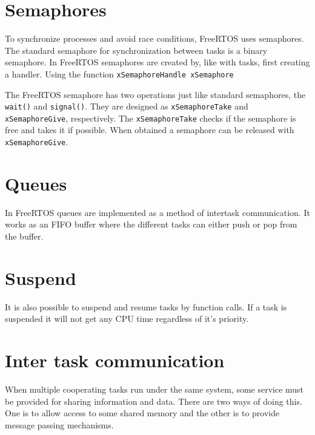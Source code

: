 \section{ Semaphores }

To synchronize processes and avoid race conditions, FreeRTOS uses semaphores. The standard semaphore for synchronization between tasks is a binary semaphore. In FreeRTOS semaphores are created by, like with tasks, first creating a handler. Using the function \texttt{xSemaphoreHandle xSemaphore}

The FreeRTOS semaphore has two operations just like standard semaphores, the \texttt{wait()} and \texttt{signal()}. They are designed as \texttt{xSemaphoreTake} and \texttt{xSemaphoreGive}, respectively. The \texttt{xSemaphoreTake} checks if the semaphore is free and takes it if possible.
When obtained a semaphore can be released with \texttt{xSemaphoreGive}.

\section{ Queues }

In FreeRTOS queues are implemented as a method of intertask communication. It works as an FIFO buffer where the different tasks can either push or pop from the buffer.

\section{ Suspend }
It is also possible to suspend and resume tasks by function calls. If a task is suspended it will not get any CPU time regardless of it's priority.

%
%

\section{Inter task communication}
When multiple cooperating tasks run under the same system, some service must be
provided for sharing information and data. There are two ways of doing this. One
is to allow access to some shared memory and the other is to provide message
passing mechanisms.

